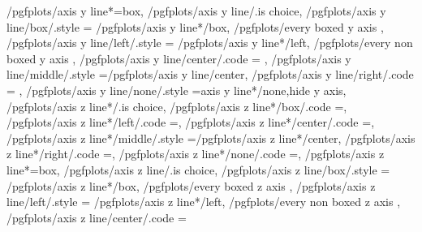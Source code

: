 {	/pgfplots/axis y line*=box,
	/pgfplots/axis y line/.is choice,
	/pgfplots/axis y line/box/.style	={
		/pgfplots/axis y line*/box,
		/pgfplots/every boxed y axis
	},
	/pgfplots/axis y line/left/.style	={
		/pgfplots/axis y line*/left,
		/pgfplots/every non boxed y axis
	},
	/pgfplots/axis y line/center/.code	={
		\ifnum{} %
		\else
		\fi
	},
	/pgfplots/axis y line/middle/.style	={/pgfplots/axis y line/center},
	/pgfplots/axis y line/right/.code	={%
		\ifnum{}
		\fi
	},%
	/pgfplots/axis y line/none/.style	={axis y line*/none,hide y axis},
%
	/pgfplots/axis z line*/.is choice,
	/pgfplots/axis z line*/box/.code	={\def\pgfplots@zaxislinesnum{0}\def\pgfplots@ztickposnum{0}},
	/pgfplots/axis z line*/left/.code	={\def\pgfplots@zaxislinesnum{1}\def\pgfplots@ztickposnum{1}\let\pgfplots@zticklabel@pos\pgfutil@empty},
	/pgfplots/axis z line*/center/.code	={\def\pgfplots@zaxislinesnum{2}\def\pgfplots@ztickposnum{2}\let\pgfplots@zticklabel@pos\pgfutil@empty},
	/pgfplots/axis z line*/middle/.style	={/pgfplots/axis z line*/center},
	/pgfplots/axis z line*/right/.code	={\def\pgfplots@zaxislinesnum{3}\def\pgfplots@ztickposnum{3}\let\pgfplots@zticklabel@pos\pgfutil@empty},
	/pgfplots/axis z line*/none/.code	={\def\pgfplots@zaxislinesnum{4}\def\pgfplots@ztickposnum{4}\let\pgfplots@zticklabel@pos\pgfutil@empty},
	/pgfplots/axis z line*=box,
	/pgfplots/axis z line/.is choice,
	/pgfplots/axis z line/box/.style	={
		/pgfplots/axis z line*/box,
		/pgfplots/every boxed z axis
	},
	/pgfplots/axis z line/left/.style	={
		/pgfplots/axis z line*/left,
		/pgfplots/every non boxed z axis
	},
	/pgfplots/axis z line/center/.code	={
}}
